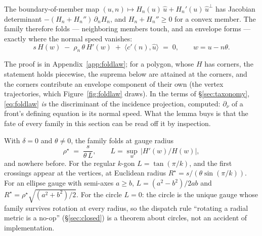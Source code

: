 \begin{lemma}
\label{lem:foldlaw}
The boundary-of-member map $(u,n)\mapsto H_n(u)\,\hat u+H_n'(u)\,\hat u^{\perp}$
has Jacobian determinant $-(H_n+H_n'')\,\partial_n H_n$, and $H_n+H_n''\ge0$
for a convex member. The family therefore folds --- neighboring members
touch, and an envelope forms --- exactly where the normal speed vanishes:
\begin{equation}
  s\,H(w)\;-\;\rho_n\,\theta\,H'(w)\;+\;\langle c'(n),\hat u\rangle \;=\; 0,
  \qquad w=u-n\theta.
  \label{eq:foldlaw}
\end{equation}
\end{lemma}

The proof is in Appendix~\ref{app:foldlaw}; for a polygon, whose $H$ has
corners, the statement holds piecewise, the suprema below are attained at
the corners, and the corners contribute an envelope component of their own
(the vertex trajectories, which Figure~\ref{fig:foldlaw} draws). In the
terms of \S\ref{sec:taxonomy}, \eqref{eq:foldlaw} \emph{is} the discriminant
of the incidence projection, computed: $\partial_\nu$ of a front's defining
equation is its normal speed. What the lemma buys is that the fate of every
family in this section can be read off it by inspection.

\begin{corollary}
\label{cor:rotation}
With $\delta=0$ and $\theta\neq0$, the family folds at gauge radius
\begin{equation}
  \rho^\star \;=\; \frac{s}{\theta\,L},
  \qquad L=\sup_w\,\lvert H'(w)/H(w)\rvert,
  \label{eq:foldradius}
\end{equation}
and nowhere before. For the regular $k$-gon $L=\tan(\pi/k)$, and the first
crossings appear at the vertices, at Euclidean radius
$R^\star=s/(\theta\sin(\pi/k))$. For an ellipse gauge with semi-axes $a\ge b$,
$L=(a^2-b^2)/2ab$ and $R^\star=\rho^\star\sqrt{(a^2+b^2)/2}$. For the circle
$L=0$: the circle is the unique gauge whose family survives rotation at every
radius, so the dispatch rule ``rotating a radial metric is a no-op''
(\S\ref{sec:closed}) is a theorem about circles, not an accident of
implementation.
\end{corollary}

